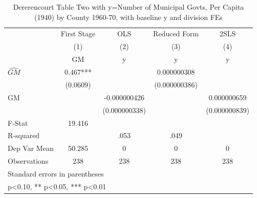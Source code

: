 \begin{table}[htbp]\centering
\def\sym#1{\ifmmode^{#1}\else\(^{#1}\)\fi}
\caption{Dererencourt Table Two with y=Number of Municipal Govts, Per Capita (1940) by County 1960-70, with baseline y and division FEs}
\begin{tabular}{l*{4}{c}}
\toprule
                    & First Stage   &         OLS   &Reduced Form   &        2SLS   \\
                    &\multicolumn{1}{c}{(1)}&\multicolumn{1}{c}{(2)}&\multicolumn{1}{c}{(3)}&\multicolumn{1}{c}{(4)}\\
                    &\multicolumn{1}{c}{GM}&\multicolumn{1}{c}{y}&\multicolumn{1}{c}{y}&\multicolumn{1}{c}{y}\\
\midrule
$\hat{GM}$          &       0.467***&               & 0.000000308   &               \\
                    &    (0.0609)   &               &(0.000000386)   &               \\
\addlinespace
GM                  &               &-0.000000426   &               & 0.000000659   \\
                    &               &(0.000000338)   &               &(0.000000839)   \\
\midrule
F-Stat              &      19.416   &               &               &               \\
R-squared           &               &        .053   &        .049   &               \\
Dep Var Mean        &      50.285   &           0   &           0   &           0   \\
Observations        &         238   &         238   &         238   &         238   \\
\bottomrule
\multicolumn{5}{l}{\footnotesize Standard errors in parentheses}\\
\multicolumn{5}{l}{\footnotesize * p<0.10, ** p<0.05, *** p<0.01}\\
\end{tabular}
\end{table}
